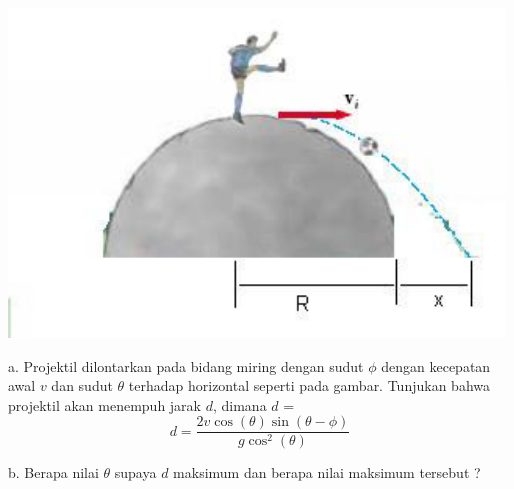 \item
\mbox{}
\begin{center}
\includegraphics [scale=0.3]{./latex/eps/1_4_2_image_1-eps-converted-to.pdf}
\end{center}a. Projektil dilontarkan pada bidang miring dengan sudut $\phi$ dengan kecepatan awal $v$ dan sudut $\theta$ terhadap horizontal seperti pada gambar. Tunjukan bahwa projektil akan menempuh jarak $d$, dimana $d$ =
\begin{equation*}
        d= \frac{2 v \cos \left(\theta\right) \sin\left(\theta-\phi\right)}{g \cos^2\left(\theta\right)}
\end{equation*}

b. Berapa nilai $\theta$ supaya $d$ maksimum dan berapa nilai maksimum tersebut ?

